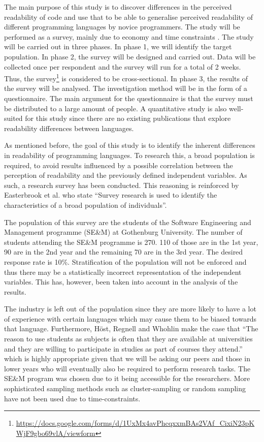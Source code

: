 \documentclass[times, 10pt,twocolumn]{Article}
\begin{document}
The main purpose of this study is to discover differences in the perceived readability of code and use that to be able to generalise perceived readability of different programming languages by novice programmers. The study will be performed as a survey, mainly due to economy and time constraints \cite{fowler2008survey}. The study will be carried out in three phases. In phase 1, we will identify the target population. In phase 2, the survey will be designed and carried out. Data will be collected once per respondent and the survey will run for a total of 2 weeks. Thus, the survey\footnote{\url{https://docs.google.com/forms/d/1UxMx4avPhcqxxmBAs2VAf_CixiN23pKWjF9gbo69vlA/viewform}} is considered to be cross-sectional. In phase 3, the results of the survey will be analysed. The investigation method will be in the form of a questionnaire. The main argument for the questionnaire is that the survey must be distributed to a large amount of people. A quantitative study is also well-suited for this study since there are no existing publications that explore readability differences between languages. 


As mentioned before, the goal of this study is to identify the inherent differences in readability of programming languages. To research this, a broad population is required, to avoid results influenced by a possible correlation between the perception of readability and the previously defined independent variables. As such, a research survey has been conducted. This reasoning is reinforced by Easterbrook et al. \cite{easterbrook2008selecting} who state ``Survey research is used to identify the characteristics of a broad population of individuals''. 

The population of this survey are the students of the Software Engineering and Management programme (SE\&M) at Gothenburg University. The number of students attending the SE\&M programme is 270. 110 of those are in the 1st year, 90 are in the 2nd year and the remaining 70 are in the 3rd year. The desired response rate is 10\%. Stratification of the population will not be enforced and thus there may be a statistically incorrect representation of the independent variables. This has, however, been taken into account in the analysis of the results. 

The industry is left out of the population since they are more likely to have a lot of experience with certain languages which may cause them to be biased towards that language. Furthermore, Höst, Regnell and Whohlin \cite{host2000using} make the case that ``The reason to use students as subjects is often that they are available at universities and they are willing to participate in studies as part of courses they attend.'' which is highly appropriate given that we will be asking our peers and those in lower years who will eventually also be required to perform research tasks. The SE\&M program was chosen due to it being accessible for the researchers. More sophisticated sampling methods such as cluster-sampling or random sampling have not been used due to time-constraints. 
\end{document}
